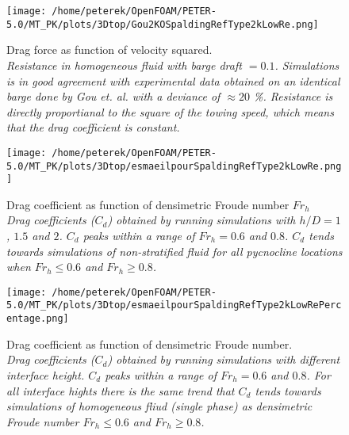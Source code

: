 \documentclass[a4paper, 12pt]{report}
\begin{document}
\begin{figure}[H]
	\centering
	\texttt{[image: /home/peterek/OpenFOAM/PETER-5.0/MT\_PK/plots/3Dtop/Gou2KOSpaldingRefType2kLowRe.png]}
	\caption{Drag force as function of velocity squared. \\ \textit{Resistance in homogeneous fluid with barge draft $=0.1$. Simulations is in good agreement with experimental data obtained on an identical barge done by Gou et. al. \cite{Gou} with a deviance of $\approx 20$ \%. Resistance is directly proportianal to the square of the towing speed, which means that the drag coefficient is constant. }}
	\label{fig:dragForce}
\end{figure}

\begin{minipage}[t]{.45\textwidth}
	\begin{figure}[H]
		\centering
		\texttt{[image: /home/peterek/OpenFOAM/PETER-5.0/MT\_PK/plots/3Dtop/esmaeilpourSpaldingRefType2kLowRe.png]}
		\caption{Drag coefficient as function of densimetric Froude number $Fr_h$  \\ \textit{Drag coefficients ($C_d$) obtained by running simulations with $h/D=1$, $1.5$ and $2$. $C_d$ peaks within a range of $Fr_h = 0.6$ and $0.8$. $C_d$ tends towards simulations of non-stratified fluid for all pycnocline locations when $Fr_h \leq 0.6$ and $Fr_h \geq 0.8$.}}
		\label{fig:Cd}
	\end{figure}
\end{minipage}\hfill
\vspace{2ex}
\begin{minipage}[t]{.45\textwidth} 
	\begin{figure}[H]
		\centering
		\texttt{[image: /home/peterek/OpenFOAM/PETER-5.0/MT\_PK/plots/3Dtop/esmaeilpourSpaldingRefType2kLowRePercentage.png]}
		\caption{Drag coefficient as function of densimetric Froude number.  \\ \textit{Drag coefficients ($C_d$) obtained by running simulations with different interface height. $C_d$ peaks within a range of $Fr_h = 0.6$ and $0.8$. For all interface hights there is the same trend that $C_d$ tends towards simulations of homogeneous fliud (single phase) as densimetric Froude number $Fr_h \leq 0.6$ and $Fr_h \geq 0.8$.}}
		\label{fig:CdPercentageDifference}
	\end{figure}
\end{minipage}\hfill
\vspace{2ex}
\end{document}
